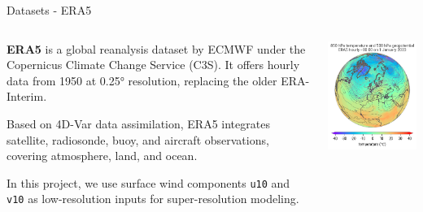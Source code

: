 \documentclass[footline=authortitle]{beamer}
\begin{document}
\begin{frame}{Datasets - ERA5}
\scriptsize
\begin{columns}
    \begin{column}{0.65\textwidth}
        \justifying
        \textbf{ERA5} is a global reanalysis dataset by ECMWF under the Copernicus Climate Change Service (C3S). 
        It offers hourly data from 1950 at 0.25° resolution, replacing the older ERA-Interim.

        \vspace{0.5em}
        Based on 4D-Var data assimilation, ERA5 integrates satellite, radiosonde, buoy, and aircraft observations, covering atmosphere, land, and ocean.

        \vspace{0.5em}
        In this project, we use surface wind components \texttt{u10} and \texttt{v10} as low-resolution inputs for super-resolution modeling.
    \end{column}

    \begin{column}{0.35\textwidth}
        \centering
        \includegraphics[width=\linewidth]{images/overview-detail_67e6d1d5ac470ee33ae510a76a2fe3c1c67a7f1fdd4c040a333969fe0b11f76f.png}
    \end{column}
\end{columns}
\end{frame}
\end{document}
